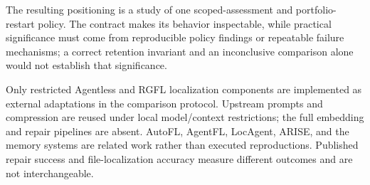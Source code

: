 \documentclass[letterpaper,journal]{IEEEtran}
\begin{document}
The resulting positioning is a study of one scoped-assessment and portfolio-restart policy. The contract makes its behavior inspectable, while practical significance must come from reproducible policy findings or repeatable failure mechanisms; a correct retention invariant and an inconclusive comparison alone would not establish that significance.

Only restricted Agentless and RGFL localization components are implemented as external adaptations in the comparison protocol. Upstream prompts and compression are reused under local model/context restrictions; the full embedding and repair pipelines are absent. AutoFL, AgentFL, LocAgent, ARISE, and the memory systems are related work rather than executed reproductions. Published repair success and file-localization accuracy measure different outcomes and are not interchangeable.
\end{document}

